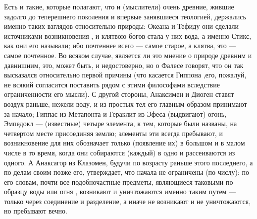 \documentclass{article}
\begin{document}
Есть и такие, которые полагают, что и (мыслители) очень древние, жившие задолго до теперешнего поколения и впервые занявшиеся теологией, держались именно таких взглядов относительно природы: Океана и Тефиду они сделали источниками
\footnotemark[6]
возникновения
\footnotemark[7]
, и клятвою богов стала у них вода, а именно Стикс, как они его называли; ибо почтеннее всего — самое старое, а клятва, это — самое почтенное. Во всяком случае, является ли это мнение о природе древним и давнишним, это, может быть, и недостоверно, но о Фалесе говорят, что он так высказался относительно первой причины (что касается Гиппона
\footnotemark[8]
,его, пожалуй, не всякий согласится поставить рядом с этими философами вследствие ограниченности его мысли). С другой стороны, Анаксимен и Диоген ставят воздух раньше, нежели воду, и из простых тел его главным образом принимают за начало; Гиппас из Метапонта и Гераклит из Эфеса (выдвигают) огонь, Эмпедокл — (известные) четыре элемента, к тем, которые были названы, на четвертом месте присоединяя землю; элементы эти всегда пребывают, и возникновение для них обозначает только (появление их) в большом и в малом числе в то время, когда они собираются (каждый) в одно и рассеиваются из одного.
\footnotemark[9]
А Анаксагор из Клазомен, будучи по возрасту раньше этого последнего, а по делам своим позже его, утверждает, что начала не ограничены (по числу): по его словам, почти все подобночастные предметы, являющиеся таковыми по образцу воды или огня
\footnotemark[10]
, возникают и уничтожаются именно таким путем — только через соединение и разделение, а иначе не возникают и не уничтожаются, но пребывают вечно.
\end{document}
